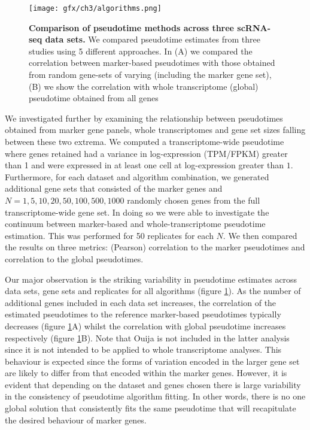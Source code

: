 \begin{figure}%
	\centering
	\texttt{[image: gfx/ch3/algorithms.png]}
	\caption{\textbf{Comparison of pseudotime methods across three scRNA-seq data sets.} We compared pseudotime estimates from three studies \cite{Shin2015,Trapnell2014-xi,zhou2016tracing} using 5 different approaches. In (A) we compared the correlation between marker-based pseudotimes with those obtained from random gene-sets of varying (including the marker gene set), (B) we show the correlation with whole transcriptome (global) pseudotime obtained from all genes }
	\label{fig:comparisons}
\end{figure}

We investigated further by examining the relationship between pseudotimes obtained from marker gene panels, whole transcriptomes and gene set sizes falling between these two extrema. We computed a transcriptome-wide pseudotime where genes retained had a variance in log-expression (TPM/FPKM) greater than 1 and were expressed in at least one cell at log-expression greater than $1$. Furthermore, for each dataset and algorithm combination, we generated additional gene sets that consisted of the marker genes and $N = 1, 5, 10, 20, 50, 100, 500, 1000$ randomly chosen genes from the full transcriptome-wide gene set. In doing so we were able to investigate the continuum between marker-based and whole-transcriptome pseudotime estimation. This was performed for 50 replicates for each $N$. We then compared the results on three metrics: (Pearson) correlation to the marker pseudotimes and correlation to the global pseudotimes.

Our major observation is the striking variability in pseudotime estimates across data sets, gene sets and replicates for all algorithms
(figure \ref{fig:comparisons}). As the number of additional genes included in each data set increases, the correlation of the estimated pseudotimes to the reference marker-based pseudotimes typically decreases (figure \ref{fig:comparisons}A) whilst the correlation with global pseudotime increases respectively (figure \ref{fig:comparisons}B). Note that Ouija is not included in the latter analysis since it is not intended to be applied to whole transcriptome analyses. This behaviour is expected since the forms of variation encoded in the larger gene set are likely to differ from that encoded within the marker genes. However, it is evident that depending on the dataset and genes chosen there is large variability in the consistency of pseudotime algorithm fitting. In other words, there is no one global solution that consistently fits the same pseudotime that will recapitulate the desired behaviour of marker genes.

